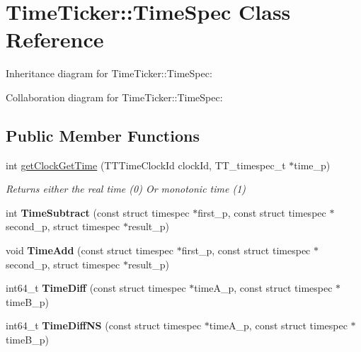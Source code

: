 \hypertarget{classTimeTicker_1_1TimeSpec}{}\section{Time\+Ticker\+::Time\+Spec Class Reference}
\label{classTimeTicker_1_1TimeSpec}


Inheritance diagram for Time\+Ticker\+::Time\+Spec\+:


Collaboration diagram for Time\+Ticker\+::Time\+Spec\+:
\subsection*{Public Member Functions}
\begin{DoxyCompactItemize}
\item 
int \mbox{\hyperlink{classTimeTicker_1_1TimeSpec_a14c9bee4971b193847d1a4a77dcc73a5}{get\+Clock\+Get\+Time}} (T\+T\+Time\+Clock\+Id clock\+Id, T\+T\+\_\+timespec\+\_\+t $\ast$time\+\_\+p)
\begin{DoxyCompactList}\small\item\em Returns either the real time (0) Or monotonic time (1) \end{DoxyCompactList}\item 
\mbox{\label{classTimeTicker_1_1TimeSpec_aa3ecdc35784c3e58d85068fa840c677d}} 
int {\bfseries Time\+Subtract} (const struct timespec $\ast$first\+\_\+p, const struct timespec $\ast$second\+\_\+p, struct timespec $\ast$result\+\_\+p)
\item 
\mbox{\label{classTimeTicker_1_1TimeSpec_a99c904275cc6cb92614ef89c91c6451c}} 
void {\bfseries Time\+Add} (const struct timespec $\ast$first\+\_\+p, const struct timespec $\ast$second\+\_\+p, struct timespec $\ast$result\+\_\+p)
\item 
\mbox{\label{classTimeTicker_1_1TimeSpec_ab31ffbf587370ac148c2606b47133041}} 
int64\+\_\+t {\bfseries Time\+Diff} (const struct timespec $\ast$time\+A\+\_\+p, const struct timespec $\ast$time\+B\+\_\+p)
\item 
\mbox{\label{classTimeTicker_1_1TimeSpec_af3b770b760f681f34a3cf3c6ede9e250}} 
int64\+\_\+t {\bfseries Time\+Diff\+NS} (const struct timespec $\ast$time\+A\+\_\+p, const struct timespec $\ast$time\+B\+\_\+p)

\end{DoxyCompactItemize}
